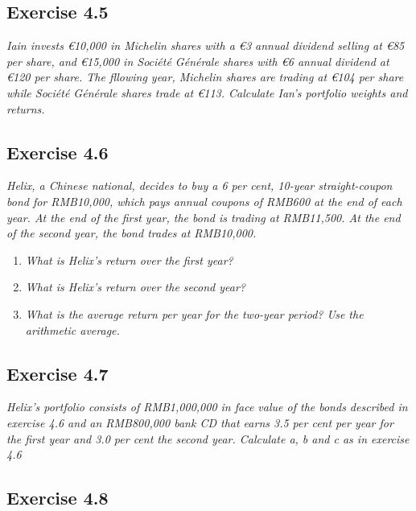 \documentclass[]{book}
\newcommand{\euro}{€}
\theoremstyle{definition}
\theoremstyle{definition}
\theoremstyle{remark}
\begin{document}
\subsection{Exercise 4.5}\label{exercise-4.5}

\emph{Iain invests \euro{}10,000 in Michelin shares with a \euro{}3
annual dividend selling at \euro{}85 per share, and \euro{}15,000 in
Société Générale shares with \euro{}6 annual dividend at \euro{}120 per
share. The fllowing year, Michelin shares are trading at \euro{}104 per
share while Société Générale shares trade at \euro{}113. Calculate Ian's
portfolio weights and returns.} \citep[p.117]{book}

\subsection{Exercise 4.6}\label{exercise-4.6}

\emph{Helix, a Chinese national, decides to buy a 6 per cent, 10-year
straight-coupon bond for RMB10,000, which pays annual coupons of RMB600
at the end of each year. At the end of the first year, the bond is
trading at RMB11,500. At the end of the second year, the bond trades at
RMB10,000.} \citep[p.117]{book}

\begin{enumerate}
\def\labelenumi{\alph{enumi}.}
\item
  \emph{What is Helix's return over the first year?} \citep[p.117]{book}
\item
  \emph{What is Helix's return over the second year?}
  \citep[p.117]{book}
\item
  \emph{What is the average return per year for the two-year period? Use
  the arithmetic average.} \citep[p.117]{book}
\end{enumerate}

\subsection{Exercise 4.7}\label{exercise-4.7}

\emph{Helix's portfolio consists of RMB1,000,000 in face value of the
bonds described in exercise 4.6 and an RMB800,000 bank CD that earns 3.5
per cent per year for the first year and 3.0 per cent the second year.
Calculate a, b and c as in exercise 4.6} \citep[p.117]{book}

\subsection{Exercise 4.8}\label{exercise-4.8}
\end{document}
